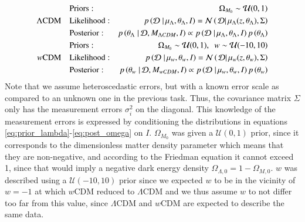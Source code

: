 \documentclass[11pt,a4paper]{article}
\begin{document}
\begin{align}
    \label{eq:prior_lambda}
    &\hspace{10px}                            \text{Priors}:  &\Omega_{M_0} \sim \mathcal{U}(0,1) \\
    \label{eq:like_lambda}
    \Lambda\text{CDM}&\hspace{10px}           \text{Likelihood}:  &p\left(\mathcal{D} \left. \right\vert \mu_{\Lambda}, \theta_{\Lambda}, I \right)  = \mathcal{N}\left( \left.\mathcal{D} \right\vert \mu_{\Lambda}(z, \theta_{\Lambda}), \Sigma\right)\\
    \label{eq:post_lambda}
    &\hspace{10px}                            \text{Posterior}: &p\left(\theta_{\Lambda} \left. \right\vert \mathcal{D}, M_{\Lambda CDM}, I \right) \propto p\left(\mathcal{D} \left. \right\vert \mu_{\Lambda}, \theta_{\Lambda}, I \right) p\left(\theta_{\Lambda} \right)\\
    \label{eq:prior_omega}
    &\hspace{10px}                            \text{Priors}:  &\Omega_{M_0} \sim \mathcal{U}(0,1), \hspace{5px} w \sim \mathcal{U}(-10,10) \\
    \label{eq:like_omega}
    w\text{CDM}& \hspace{10px}                \text{Likelihood}:  &p\left(\mathcal{D} \left. \right\vert \mu_{w}, \theta_{w}, I \right)  = \mathcal{N}\left( \left.\mathcal{D} \right\vert \mu_{w}(z, \theta_{w}), \Sigma\right)\\
    \label{eq:post_omega}
    &\hspace{10px}                            \text{Posterior}: &p\left(\theta_{w} \left. \right\vert \mathcal{D}, M_{wCDM}, I \right) \propto p\left(\mathcal{D} \left. \right\vert \mu_{w}, \theta_{w}, I \right) p\left(\theta_{w} \right)
\end{align}
Note that we assume heteroscedastic errors, but with a known error scale as compared to an unknown one in the previous task. Thus, the covariance matrix $\Sigma$ only has the measurement errors $\sigma_i^2$ on the diagonal. This knowledge of the measurement errors is expressed by conditioning the distributions in equations \eqref{eq:prior_lambda}-\eqref{eq:post_omega} on $I$. $\Omega_{M_0}$ was given a $\mathcal{U}(0,1)$ prior, since it corresponds to the dimensionless matter density parameter which means that they are non-negative, and according to the Friedman equation it cannot exceed 1, since that would imply a negative dark energy density $\Omega_{\Lambda,0}=1-\Omega_{M,0}$. $w$ was described using a $\mathcal{U}(-10,10)$ prior since we expected $w$ to be in the vicinity of $w=-1$ at which $w$CDM reduced to $\Lambda$CDM and we thus assume $w$ to not differ too far from this value, since $\Lambda$CDM and $w$CDM are expected to describe the same data.
\end{document}
